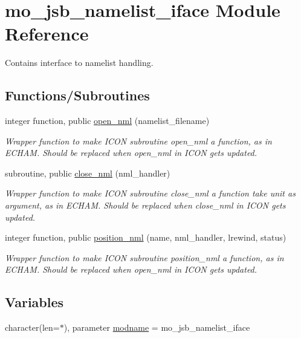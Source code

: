 \hypertarget{namespacemo__jsb__namelist__iface}{}\section{mo\+\_\+jsb\+\_\+namelist\+\_\+iface Module Reference}
\label{namespacemo__jsb__namelist__iface}


Contains interface to namelist handling.  


\subsection*{Functions/\+Subroutines}
\begin{DoxyCompactItemize}
\item 
integer function, public \hyperlink{namespacemo__jsb__namelist__iface_abb2821ffd4c30375faa307d522af3bcb}{open\+\_\+nml} (namelist\+\_\+filename)
\begin{DoxyCompactList}\small\item\em Wrapper function to make I\+C\+O\+N subroutine open\+\_\+nml a function, as in E\+C\+H\+A\+M. Should be replaced when open\+\_\+nml in I\+C\+O\+N gets updated. \end{DoxyCompactList}\item 
subroutine, public \hyperlink{namespacemo__jsb__namelist__iface_a240047c255ab5bb3871ecdcdcd6d6a92}{close\+\_\+nml} (nml\+\_\+handler)
\begin{DoxyCompactList}\small\item\em Wrapper function to make I\+C\+O\+N subroutine close\+\_\+nml a function take unit as argument, as in E\+C\+H\+A\+M. Should be replaced when close\+\_\+nml in I\+C\+O\+N gets updated. \end{DoxyCompactList}\item 
integer function, public \hyperlink{namespacemo__jsb__namelist__iface_a4d29dc192b429a0c5f11ecd7d7f637e9}{position\+\_\+nml} (name, nml\+\_\+handler, lrewind, status)
\begin{DoxyCompactList}\small\item\em Wrapper function to make I\+C\+O\+N subroutine position\+\_\+nml a function, as in E\+C\+H\+A\+M. Should be replaced when open\+\_\+nml in I\+C\+O\+N gets updated. \end{DoxyCompactList}\end{DoxyCompactItemize}
\subsection*{Variables}
\begin{DoxyCompactItemize}
\item 
character(len=$\ast$), parameter \hyperlink{namespacemo__jsb__namelist__iface_ac285553fa6612b5913578b420275d81b}{modname} = \textquotesingle{}mo\+\_\+jsb\+\_\+namelist\+\_\+iface\textquotesingle{}
\end{DoxyCompactItemize}


